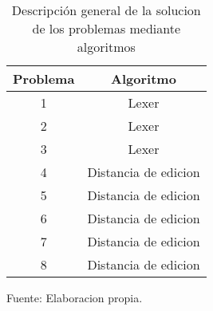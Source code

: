 \begin{table}[H]
\centering
\begin{tabular}{|c||c|}
\hline
Problema & Algoritmo \\ \hline
1 & Lexer \\ \hline
2 & Lexer \\ \hline
3 & Lexer \\ \hline
4 & Distancia de edicion \\ \hline
5 & Distancia de edicion \\ \hline
6 & Distancia de edicion \\ \hline
7 & Distancia de edicion \\ \hline
8 & Distancia de edicion \\ \hline
\end{tabular}
\caption{Descripción general de la solucion de los problemas mediante algoritmos}
Fuente: Elaboracion propia.
\label{algorithms_problems}
\end{table}
